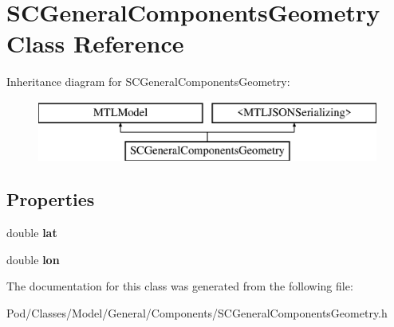 \hypertarget{interface_s_c_general_components_geometry}{}\section{S\+C\+General\+Components\+Geometry Class Reference}
\label{interface_s_c_general_components_geometry}
Inheritance diagram for S\+C\+General\+Components\+Geometry\+:\begin{figure}[H]
\begin{center}
\leavevmode
\includegraphics[height=2.000000cm]{interface_s_c_general_components_geometry}
\end{center}
\end{figure}
\subsection*{Properties}
\begin{DoxyCompactItemize}
\item 
double {\bfseries lat}\hypertarget{interface_s_c_general_components_geometry_a6410246966577b76e524adf9cf9dc3ba}{}\label{interface_s_c_general_components_geometry_a6410246966577b76e524adf9cf9dc3ba}

\item 
double {\bfseries lon}\hypertarget{interface_s_c_general_components_geometry_a6366121b676a35bf4355a954239a2729}{}\label{interface_s_c_general_components_geometry_a6366121b676a35bf4355a954239a2729}

\end{DoxyCompactItemize}


The documentation for this class was generated from the following file\+:\begin{DoxyCompactItemize}
\item 
Pod/\+Classes/\+Model/\+General/\+Components/S\+C\+General\+Components\+Geometry.\+h\end{DoxyCompactItemize}
